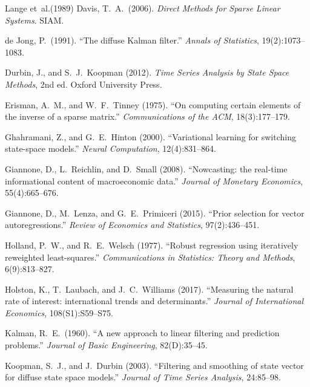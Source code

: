 \documentclass[11pt]{article}
\begin{document}
\begin{thebibliography}{Lange et~al.(1989)}
Davis, T.\ A.\ (2006).
\emph{Direct Methods for Sparse Linear Systems}.
SIAM.

de Jong, P.\ (1991).
``The diffuse Kalman filter.''
\emph{Annals of Statistics}, 19(2):1073--1083.

Durbin, J., and S.\ J.\ Koopman (2012).
\emph{Time Series Analysis by State Space Methods}, 2nd ed.
Oxford University Press.

Erisman, A.\ M., and W.\ F.\ Tinney (1975).
``On computing certain elements of the inverse of a sparse matrix.''
\emph{Communications of the ACM}, 18(3):177--179.

Ghahramani, Z., and G.\ E.\ Hinton (2000).
``Variational learning for switching state-space models.''
\emph{Neural Computation}, 12(4):831--864.

Giannone, D., L.\ Reichlin, and D.\ Small (2008).
``Nowcasting: the real-time informational content of macroeconomic
data.''
\emph{Journal of Monetary Economics}, 55(4):665--676.

Giannone, D., M.\ Lenza, and G.\ E.\ Primiceri (2015).
``Prior selection for vector autoregressions.''
\emph{Review of Economics and Statistics}, 97(2):436--451.

Holland, P.\ W., and R.\ E.\ Welsch (1977).
``Robust regression using iteratively reweighted least-squares.''
\emph{Communications in Statistics: Theory and Methods}, 6(9):813--827.

Holston, K., T.\ Laubach, and J.\ C.\ Williams (2017).
``Measuring the natural rate of interest: international trends and
determinants.''
\emph{Journal of International Economics}, 108(S1):S59--S75.

Kalman, R.\ E.\ (1960).
``A new approach to linear filtering and prediction problems.''
\emph{Journal of Basic Engineering}, 82(D):35--45.

Koopman, S.\ J., and J.\ Durbin (2003).
``Filtering and smoothing of state vector for diffuse state space
models.''
\emph{Journal of Time Series Analysis}, 24:85--98.


\end{thebibliography}
\end{document}
